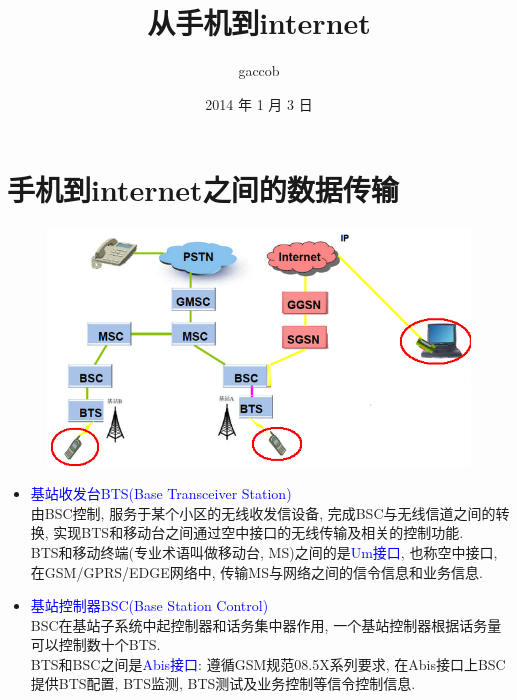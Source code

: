 

\title {\ZHH \huge 从手机到internet}
\author {\small gaccob}
\date {\small 2014 年 1 月 3 日}
\maketitle

\section {\ZHH 手机到internet之间的数据传输} {
    \begin {figure} [htbp]
        \centering
        \includegraphics [width=400pt, keepaspectratio] {transfer.png}
    \end {figure}

    \begin {itemize}
        \item { \textcolor {blue} {基站收发台BTS(Base Transceiver Station) } } \\
        { 由BSC控制, 服务于某个小区的无线收发信设备, 完成BSC与无线信道之间的转换, 实现BTS和移动台之间通过空中接口的无线传输及相关的控制功能. } \\
        { BTS和移动终端(专业术语叫做移动台, MS)之间的是\textcolor{blue}{Um接口}, 也称空中接口, 在GSM/GPRS/EDGE网络中, 传输MS与网络之间的信令信息和业务信息. } \\

        \item { \textcolor {blue} {基站控制器BSC(Base Station Control)} } \\
        { BSC在基站子系统中起控制器和话务集中器作用, 一个基站控制器根据话务量可以控制数十个BTS. } \\
        { BTS和BSC之间是\textcolor{blue}{Abis接口}: 遵循GSM规范08.5X系列要求, 在Abis接口上BSC提供BTS配置, BTS监测, BTS测试及业务控制等信令控制信息. } \\


\end{itemize}}
